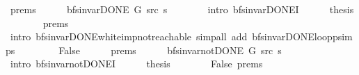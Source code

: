 \begin{isabellebody}
\ {\isachardoublequoteopen}{}{\isachardot}{\kern0pt}prems{\isachardoublequoteclose}{\isacharparenleft}{\kern0pt}{}{\isacharparenright}{\kern0pt}\isanewline
\ \ \ \ \isamarkupfalse%
\ {\isachardoublequoteopen}bfs{\isacharunderscore}{\kern0pt}invar{\isacharunderscore}{\kern0pt}DONE{\isacharprime}{\kern0pt}\ G\ src\ s{\isachardoublequoteclose}\isanewline
\ \ \ \ \ \ \isamarkupfalse%
\ {\isacharparenleft}{\kern0pt}intro\ bfs{\isacharunderscore}{\kern0pt}invar{\isacharunderscore}{\kern0pt}DONE{\isacharprime}{\kern0pt}I{\isacharparenright}{\kern0pt}\isanewline
\ \ \ \ \isamarkupfalse%
\ {\isacharquery}{\kern0pt}thesis\isanewline
\ \ \ \ \ \ \isamarkupfalse%
\ {\isachardoublequoteopen}{}{\isachardot}{\kern0pt}prems{\isachardoublequoteclose}{\isacharparenleft}{\kern0pt}{}{\isacharparenright}{\kern0pt}\isanewline
\ \ \ \ \ \ \isamarkupfalse%
\ {\isacharparenleft}{\kern0pt}intro\ bfs{\isacharunderscore}{\kern0pt}invar{\isacharunderscore}{\kern0pt}DONE{\isachardot}{\kern0pt}white{\isacharunderscore}{\kern0pt}imp{\isacharunderscore}{\kern0pt}not{\isacharunderscore}{\kern0pt}reachable{\isacharparenright}{\kern0pt}\ {\isacharparenleft}{\kern0pt}simp{\isacharunderscore}{\kern0pt}all\ add{\isacharcolon}{\kern0pt}\ bfs{\isacharunderscore}{\kern0pt}invar{\isacharunderscore}{\kern0pt}DONE{\isachardot}{\kern0pt}loop{\isacharunderscore}{\kern0pt}psimps{\isacharparenright}{\kern0pt}\isanewline
\ \ \isamarkupfalse%
\isanewline
\ \ \ \ \isamarkupfalse%
\ False\isanewline
\ \ \ \ \isamarkupfalse%
\ {\isachardoublequoteopen}{}{\isachardot}{\kern0pt}prems{\isachardoublequoteclose}{\isacharparenleft}{\kern0pt}{}{\isacharparenright}{\kern0pt}\isanewline
\ \ \ \ \isamarkupfalse%
\ {\isachardoublequoteopen}bfs{\isacharunderscore}{\kern0pt}invar{\isacharunderscore}{\kern0pt}not{\isacharunderscore}{\kern0pt}DONE{\isacharprime}{\kern0pt}\ G\ src\ s{\isachardoublequoteclose}\isanewline
\ \ \ \ \ \ \isamarkupfalse%
\ {\isacharparenleft}{\kern0pt}intro\ bfs{\isacharunderscore}{\kern0pt}invar{\isacharunderscore}{\kern0pt}not{\isacharunderscore}{\kern0pt}DONE{\isacharprime}{\kern0pt}I{\isacharparenright}{\kern0pt}\isanewline
\ \ \ \ \isamarkupfalse%
\ {\isacharquery}{\kern0pt}thesis\isanewline
\ \ \ \ \ \ \isamarkupfalse%
\ False\ {\isachardoublequoteopen}{}{\isachardot}{\kern0pt}prems{\isachardoublequoteclose}{\isacharparenleft}{\kern0pt}{}{\isacharparenright}{\kern0pt}\isanewline

\end{isabellebody}
